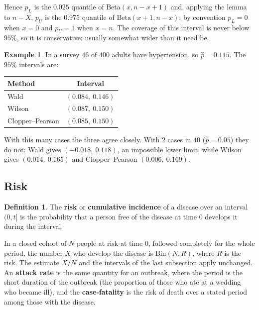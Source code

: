 \documentclass[11pt,a4paper]{article}
\numberwithin{equation}{section}
\theoremstyle{definition}
\newtheorem{defn}[thm]{Definition}
\newtheorem{exa}[thm]{Example}
\begin{document}
Hence $p_L$ is the $0.025$ quantile of $\text{Beta}(x, n - x + 1)$ and, applying the lemma to $n - X$, $p_U$ is the $0.975$ quantile of
$\text{Beta}(x + 1, n - x)$; by convention $p_L = 0$ when $x = 0$ and $p_U = 1$ when $x = n$. The coverage of this interval is never below $95\%$,
so it is conservative: usually somewhat wider than it need be.

\begin{exa}
\label{exa:prevci}
In a survey $46$ of $400$ adults have hypertension, so $\hat p = 0.115$. The $95\%$ intervals are:
\begin{center}
\begin{tabular}{lc}
\hline
Method & Interval \\
\hline
Wald & $(0.084,\ 0.146)$ \\
Wilson & $(0.087,\ 0.150)$ \\
Clopper--Pearson & $(0.085,\ 0.150)$ \\
\hline
\end{tabular}
\end{center}
With this many cases the three agree closely. With $2$ cases in $40$ ($\hat p = 0.05$) they do not: Wald gives $(-0.018,\ 0.118)$, an
impossible lower limit, while Wilson gives $(0.014,\ 0.165)$ and Clopper--Pearson $(0.006,\ 0.169)$.
\end{exa}

\subsection{Risk}
\label{sec:risk}

\begin{defn}
The \textbf{risk} or \textbf{cumulative incidence} of a disease over an interval $(0, t]$ is the probability that a person free of the disease
at time $0$ develops it during the interval.
\end{defn}

In a closed cohort of $N$ people at risk at time $0$, followed completely for the whole period, the number $X$ who develop the disease is
$\text{Bin}(N, R)$, where $R$ is the risk. The estimate $X/N$ and the intervals of the last subsection apply unchanged. An \textbf{attack rate} is
the same quantity for an outbreak, where the period is the short duration of the outbreak (the proportion of those who ate at a
wedding who became ill), and the \textbf{case-fatality} is the risk of death over a stated period among those with the disease.
\end{document}
